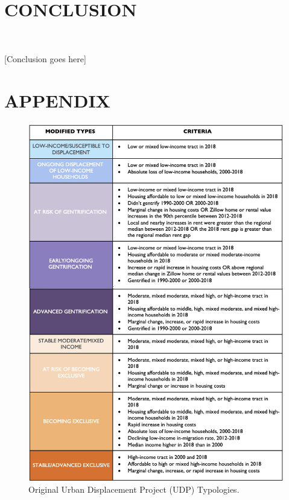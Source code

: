 \documentclass[12pt]{article}
\begin{document}
\section{CONCLUSION}\

{\color{red}[Conclusion goes here]}

\clearpage
\section{APPENDIX}

\begin{figure}%
  \centering %
  \includegraphics[height=0.95\textheight]{images/typology_sheet_2018}
  \captionsetup{justification=centering, singlelinecheck=false, margin=2cm}
  \caption[UDP Displacement Typologies]{Original Urban Displacement Project (UDP) Typologies.}
  \label{fig:original_udp}
\end{figure}
\end{document}
